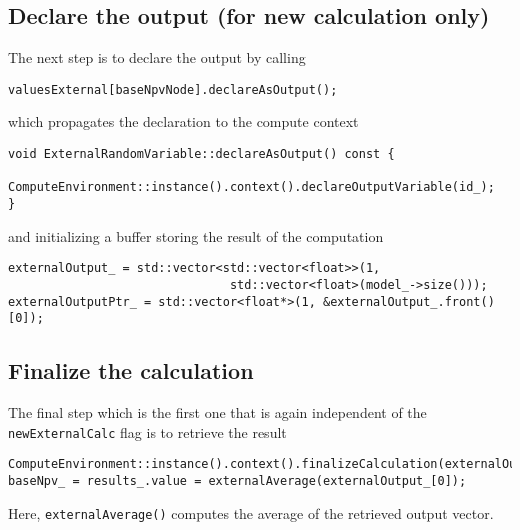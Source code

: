 \documentclass[12pt, a4paper]{article}
\begin{document}
\subsection{Declare the output (for new calculation only)}

The next step is to declare the output by calling

\begin{verbatim}
valuesExternal[baseNpvNode].declareAsOutput();
\end{verbatim}

which propagates the declaration to the compute context

\begin{verbatim}
void ExternalRandomVariable::declareAsOutput() const {
    ComputeEnvironment::instance().context().declareOutputVariable(id_);
}
\end{verbatim}

and initializing a buffer storing the result of the computation

\begin{verbatim}
externalOutput_ = std::vector<std::vector<float>>(1,
                               std::vector<float>(model_->size()));
externalOutputPtr_ = std::vector<float*>(1, &externalOutput_.front()[0]);
\end{verbatim}

\subsection{Finalize the calculation}

The final step which is the first one that is again independent of the \verb+newExternalCalc+ flag is to retrieve the result

\begin{verbatim}
ComputeEnvironment::instance().context().finalizeCalculation(externalOutputPtr_);
baseNpv_ = results_.value = externalAverage(externalOutput_[0]);
\end{verbatim}

Here, \verb+externalAverage()+ computes the average of the retrieved output vector.

\end{document}

